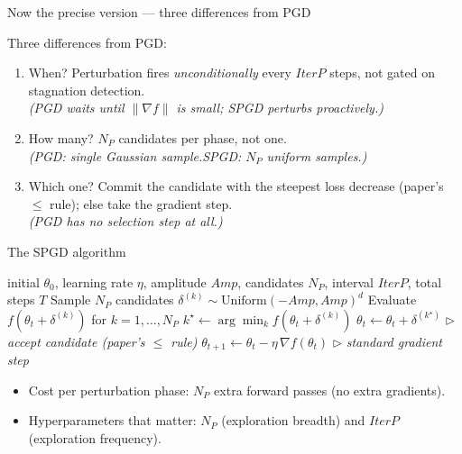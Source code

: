 \documentclass[11pt,aspectratio=169]{beamer}
\newcommand{\np}{\ensuremath{N_P}}
\newcommand{\iterp}{\ensuremath{\textit{IterP}}}
\newcommand{\amp}{\ensuremath{\textit{Amp}}}
\begin{document}
\begin{frame}{Now the precise version --- three differences from PGD}
  \scriptsize{\citep{vahedi2024spgd}}
  \vspace{0.4em}

  Three differences from PGD:
  \begin{enumerate}\setlength\itemsep{0.5em}
    \item \alert{When?} Perturbation fires \emph{unconditionally} every
          \iterp{} steps, not gated on stagnation detection. \\
          \scriptsize\emph{(PGD waits until $\|\nabla f\|$ is small;
          SPGD perturbs proactively.)}
    \item \alert{How many?} \np{} candidates per phase, not one. \\
          \scriptsize\emph{(PGD: single Gaussian sample.\;SPGD:
          \np{} uniform samples.)}
    \item \alert{Which one?} Commit the candidate with the steepest
          loss decrease (paper's $\le$ rule); else take the gradient step. \\
          \scriptsize\emph{(PGD has no selection step at all.)}
  \end{enumerate}
\end{frame}

\begin{frame}{The SPGD algorithm}
  \scriptsize
  \begin{algorithmic}[1]
    \Require initial \(\theta_0\), learning rate \(\eta\), amplitude \amp{},
             candidates \np{}, interval \iterp{}, total steps \(T\)
      \If{\(t \bmod \iterp{} = 0\) \textbf{and} \(t > 0\)}
        \State Sample \np{} candidates
               \(\delta^{(k)} \!\sim\! \mathrm{Uniform}(-\amp,\amp)^d\)
        \State Evaluate \(f(\theta_t + \delta^{(k)})\) for \(k = 1,\dots,\np{}\)
        \State \(k^\star \gets \arg\min_k f(\theta_t + \delta^{(k)})\)
          \State \(\theta_t \gets \theta_t + \delta^{(k^\star)}\)
                 \quad\(\triangleright\) \textit{accept candidate (paper's $\le$ rule)}
        \EndIf
      \EndIf
      \State \(\theta_{t+1} \gets \theta_t - \eta\,\nabla f(\theta_t)\)
             \quad\(\triangleright\) \textit{standard gradient step}
    \EndFor
  \end{algorithmic}
  \vspace{0.5em}
  \normalsize
  \begin{itemize}
    \item Cost per perturbation phase: \np{} extra forward passes (no extra gradients).
    \item Hyperparameters that matter: \alert{\np{}} (exploration breadth) and
          \alert{\iterp{}} (exploration frequency).
  \end{itemize}
\end{frame}
\end{document}
